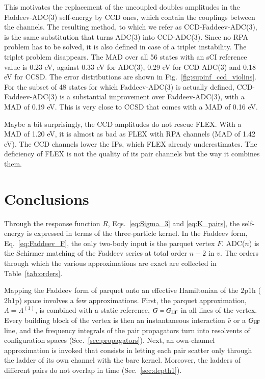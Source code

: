 \documentclass[aip,jcp,reprint,noshowkeys,superscriptaddress]{revtex4-1}
\newcommand{\hhp}{\text{2h1p}}
\newcommand{\pph}{\text{2p1h}}
\begin{document}
This motivates the replacement of the uncoupled doubles amplitudes in
the Faddeev-ADC(3) self-energy by CCD ones, which contain the couplings
between the channels. The resulting method, to which we refer
as CCD-Faddeev-ADC(3), is the same substitution that turns
ADC(3) into CCD-ADC(3).\cite{forster2026third} Since no RPA problem has to be
solved, it is also defined in case of a triplet instability.
The triplet problem disappears.
The MAD over all 56 states with an sCI reference value is 0.23 eV, against 0.33 eV for ADC(3),
0.29 eV for CCD-ADC(3) and 0.18 eV for CCSD. The error distributions are shown in
Fig.~\ref{fig:supinf_ccd_violins}.
For the subset of 48 states
for which Faddeev-ADC(3) is actually defined, 
CCD-Faddeev-ADC(3) is a substantial improvement over Faddeev-ADC(3), with a MAD of 0.19 eV.
This is very close to CCSD that comes with a MAD of 0.16 eV. 

Maybe a bit surprisingly, the CCD amplitudes do not rescue FLEX. With a
MAD of 1.20 eV, it is almost as bad as FLEX with RPA
channels (MAD of 1.42 eV).
The CCD channels lower the IPs, which FLEX already underestimates. The
deficiency of FLEX is not the quality of its pair channels but the way it
combines them.


\section{\label{sec:conclusions}Conclusions}
Through the response function $R$, Eqs.~\eqref{eq:Sigma_3} and
\eqref{eq:K_pairs}, the self-energy is expressed in
terms of the three-particle kernel. In the
Faddeev form, Eq.~\eqref{eq:Faddeev_F}, the only two-body input is the
parquet vertex $F$. ADC($n$) is the
Schirmer matching of the Faddeev series at total order $n-2$ in $v$.
The orders through which the various
approximations are exact are collected in Table~\ref{tab:orders}.

Mapping the Faddeev form of parquet onto an effective Hamiltonian of
the $\pph$ ($\hhp$) space involves a few approximations. First, the
parquet approximation, $\Lambda=\Lambda^{(1)}$, is combined with a
static reference, $G=G_{\rm HF}$ in all lines of the vertex. Every building block of
the vertex is then an instantaneous interaction $\bar v$ or a
$G_{\rm HF}$ line, and the frequency integrals of the pair propagators
turn into resolvents of configuration spaces (Sec.~\ref{sec:propagators}).
Next, an own-channel approximation is invoked that consists in
letting each pair scatter only through the ladder of its own
channel with the bare kernel. Moreover, 
the ladders of different pairs do not
overlap in time (Sec.~\ref{sec:depth1}). 
\end{document}
